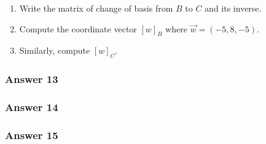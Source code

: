 \documentclass[11pt]{article}
\begin{document}
\begin{enumerate}
\item Write the matrix of change of basis from $B$ to $C$ and its inverse.
\item Compute the coordinate vector $[w]_B$ where $\vec{w} = (-5,8,-5)$.
\item Similarly, compute $[w]_C$.
\end{enumerate}

\subsubsection{Answer 13}
\label{sec-1-6-1}

\subsubsection{Answer 14}
\label{sec-1-6-2}

\subsubsection{Answer 15}
\label{sec-1-6-3}
\end{document}
